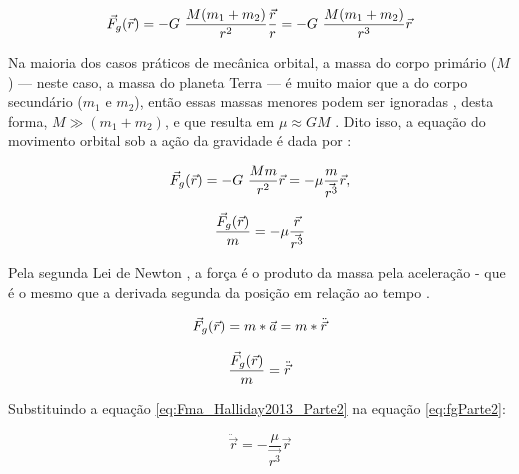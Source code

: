 \begin{equation}
\label{eq:newtonGravitacao_Parte1}
\vec{F}_g(\vec{r}) = - G\ \frac{M(m_1+m_2)}{r^2} \frac{\vec{r}}{r} = - G\ \frac{M(m_1+m_2)}{r^3} {\vec{r}}
\end{equation}

Na maioria dos casos práticos de mecânica orbital, a massa do corpo primário ($M$) — neste caso, a massa do planeta Terra — é muito maior que a do corpo secundário ($m_1$ e $m_2$), então essas massas menores podem ser ignoradas \cite{Folta2022}, desta forma, $M \gg (m_1 + m_2)$, e que resulta em $\mu \approx GM$ \cite{wie2008space}. Dito isso, a equação do movimento orbital sob a ação da gravidade é dada por \cite{newton1713}:

\begin{equation}
\label{eq:newtonGravitacao_Parte2}
\vec{F}_g(\vec{r}) =
- G\ \frac{Mm}{r^2} {\vec{r}}
= -\mu \frac{m}{\vec {r^3}}\vec r,
\end{equation}
 

\begin{equation}
\label{eq:fgParte2}
\frac{\vec{F}_g(\vec{r})}{m} = -\mu \frac{\vec{r}}{\vec {r^3}}
\end{equation}

Pela segunda Lei de Newton \cite{newton1713}, a força é o produto da massa pela aceleração \cite{halliday2013} - que é o mesmo que a derivada segunda da posição em relação ao tempo \cite{edelstein2018_derivadaSegunda}.

\begin{equation}
\label{eq:F=ma_Halliday2013Parte1}
\vec{F}_g(\vec{r}) = m * \vec a = m * \ddot{\vec{r}}
\end{equation}

\begin{equation}
\label{eq:Fma_Halliday2013_Parte2}
\frac{\vec{F}_g(\vec{r})}{m} = \ddot{\vec{r}}
\end{equation}

Substituindo a equação \eqref{eq:Fma_Halliday2013_Parte2} na equação \eqref{eq:fgParte2}:

\begin{equation}
\label{eq:eqFundamentalDoisCorpos}
\ddot {\vec r} = -\frac{\mu}{\vec {r^3}}\vec r
\end{equation}


